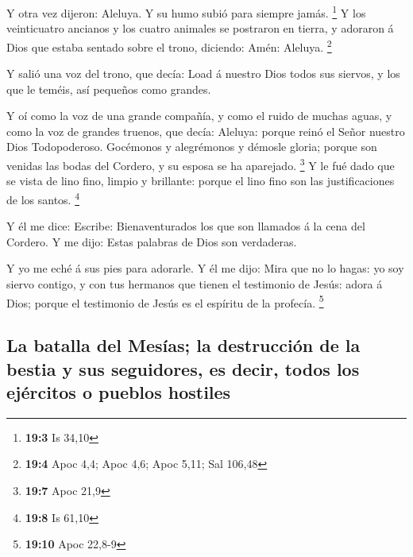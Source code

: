  Y otra vez dijeron: Aleluya. Y su humo subió para siempre
jamás. \footnote{\textbf{19:3} Is 34,10}  Y los
veinticuatro ancianos y los cuatro animales se postraron en tierra, y
adoraron á Dios que estaba sentado sobre el trono, diciendo: Amén:
Aleluya. \footnote{\textbf{19:4} Apoc 4,4; Apoc 4,6; Apoc 5,11; Sal
  106,48}

 Y salió una voz del trono, que decía: Load á nuestro Dios
todos sus siervos, y los que le teméis, así pequeños como grandes.

 Y oí como la voz de una grande compañía, y como el ruido
de muchas aguas, y como la voz de grandes truenos, que decía: Aleluya:
porque reinó el Señor nuestro Dios Todopoderoso. 
Gocémonos y alegrémonos y démosle gloria; porque son venidas las bodas
del Cordero, y su esposa se ha aparejado. \footnote{\textbf{19:7} Apoc
  21,9}  Y le fué dado que se vista de lino fino, limpio y
brillante: porque el lino fino son las justificaciones de los santos.
\footnote{\textbf{19:8} Is 61,10}

 Y él me dice: Escribe: Bienaventurados los que son
llamados á la cena del Cordero. Y me dijo: Estas palabras de Dios son
verdaderas.

 Y yo me eché á sus pies para adorarle. Y él me dijo:
Mira que no lo hagas: yo soy siervo contigo, y con tus hermanos que
tienen el testimonio de Jesús: adora á Dios; porque el testimonio de
Jesús es el espíritu de la profecía. \footnote{\textbf{19:10} Apoc
  22,8-9}

\hypertarget{la-batalla-del-mesuxedas-la-destrucciuxf3n-de-la-bestia-y-sus-seguidores-es-decir-todos-los-ejuxe9rcitos-o-pueblos-hostiles}{%
\subsection{La batalla del Mesías; la destrucción de la bestia y sus
seguidores, es decir, todos los ejércitos o pueblos
hostiles}\label{la-batalla-del-mesuxedas-la-destrucciuxf3n-de-la-bestia-y-sus-seguidores-es-decir-todos-los-ejuxe9rcitos-o-pueblos-hostiles}}

